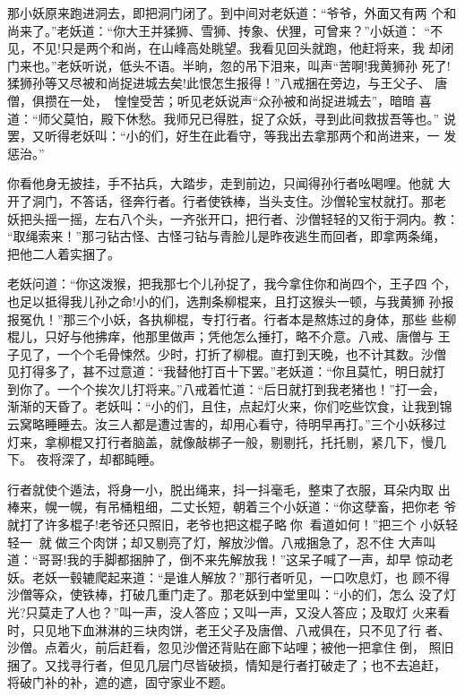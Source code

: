 那小妖原来跑进洞去，即把洞门闭了。到中间对老妖道：“爷爷，外面又有两
个和尚来了。”老妖道：“你大王并猱狮、雪狮、抟象、伏狸，可曾来？”小妖道：
“不见，不见!只是两个和尚，在山峰高处眺望。我看见回头就跑，他赶将来，我
却闭门来也。”老妖听说，低头不语。半晌，忽的吊下泪来，叫声“苦啊!我黄狮孙
死了!猱狮孙等又尽被和尚捉进城去矣!此恨怎生报得！”八戒捆在旁边，与王父子、
唐僧，俱攒在一处，惶惶受苦；听见老妖说声“众孙被和尚捉进城去”，暗暗
喜道：“师父莫怕，殿下休愁。我师兄已得胜，捉了众妖，寻到此间救拔吾等也。”
说罢，又听得老妖叫：“小的们，好生在此看守，等我出去拿那两个和尚进来，一
发惩治。”

你看他身无披挂，手不拈兵，大踏步，走到前边，只闻得孙行者吆喝哩。他就
大开了洞门，不答话，径奔行者。行者使铁棒，当头支住。沙僧轮宝杖就打。那老
妖把头摇一摇，左右八个头，一齐张开口，把行者、沙僧轻轻的又衔于洞内。教：
“取绳索来！”那刁钻古怪、古怪刁钻与青脸儿是昨夜逃生而回者，即拿两条绳，
把他二人着实捆了。

老妖问道：“你这泼猴，把我那七个儿孙捉了，我今拿住你和尚四个，王子四
个，也足以抵得我儿孙之命!小的们，选荆条柳棍来，且打这猴头一顿，与我黄狮
孙报报冤仇！”那三个小妖，各执柳棍，专打行者。行者本是熬炼过的身体，那些
些柳棍儿，只好与他拂痒，他那里做声；凭他怎么捶打，略不介意。八戒、唐僧与
王子见了，一个个毛骨悚然。少时，打折了柳棍。直打到天晚，也不计其数。沙僧
见打得多了，甚不过意道：“我替他打百十下罢。”老妖道：“你且莫忙，明日就打
到你了。一个个挨次儿打将来。”八戒着忙道：“后日就打到我老猪也！”打一会，
渐渐的天昏了。老妖叫：“小的们，且住，点起灯火来，你们吃些饮食，让我到锦
云窝略睡睡去。汝三人都是遭过害的，却用心看守，待明早再打。”三个小妖移过
灯来，拿柳棍又打行者脑盖，就像敲梆子一般，剔剔托，托托剔，紧几下，慢几下。
夜将深了，却都盹睡。

行者就使个遁法，将身一小，脱出绳来，抖一抖毫毛，整束了衣服，耳朵内取
出棒来，幌一幌，有吊桶粗细，二丈长短，朝着三个小妖道：“你这孽畜，把你老
爷就打了许多棍子!老爷还只照旧，老爷也把这棍子略你，看道如何！”把三个
小妖轻轻一，就做三个肉饼；却又剔亮了灯，解放沙僧。八戒捆急了，忍不住
大声叫道：“哥哥!我的手脚都捆肿了，倒不来先解放我！”这呆子喊了一声，却早
惊动老妖。老妖一毂辘爬起来道：“是谁人解放？”那行者听见，一口吹息灯，也
顾不得沙僧等众，使铁棒，打破几重门走了。那老妖到中堂里叫：“小的们，怎么
没了灯光?只莫走了人也？”叫一声，没人答应；又叫一声，又没人答应；及取灯
火来看时，只见地下血淋淋的三块肉饼，老王父子及唐僧、八戒俱在，只不见了行
者、沙僧。点着火，前后赶看，忽见沙僧还背贴在廊下站哩；被他一把拿住倒，
照旧捆了。又找寻行者，但见几层门尽皆破损，情知是行者打破走了；也不去追赶，
将破门补的补，遮的遮，固守家业不题。

